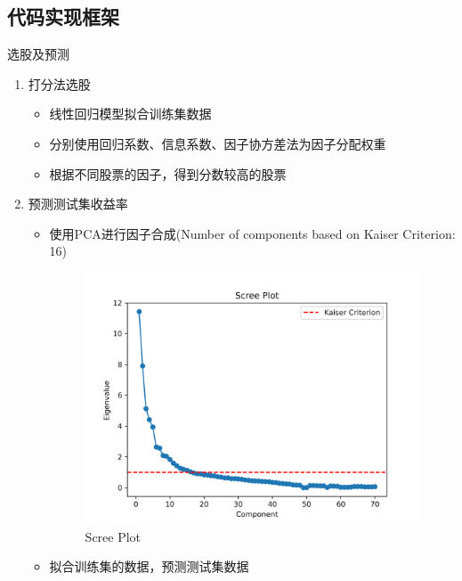 \documentclass[CJK,aspectratio=43]{beamer}  %
\begin{document}
\subsection{代码实现框架}
\begin{frame}{选股及预测}
	\begin{enumerate}
	\item 打分法选股
	\begin{itemize}
		\item 线性回归模型拟合训练集数据
		\item 分别使用回归系数、信息系数、因子协方差法为因子分配权重
		\item 根据不同股票的因子，得到分数较高的股票
	\end{itemize}
	\item 预测测试集收益率
	\begin{itemize}
		\item 使用PCA进行因子合成(Number of components based on Kaiser Criterion: 16)
		\begin{figure}
			\centering
			\includegraphics[width=0.6\linewidth]{pic/scree_plot}
			\caption{Scree Plot}
			\label{fig:screeplot}
		\end{figure}
		\item 拟合训练集的数据，预测测试集数据
	\end{itemize}
	\end{enumerate}
\end{frame}
\end{document}

